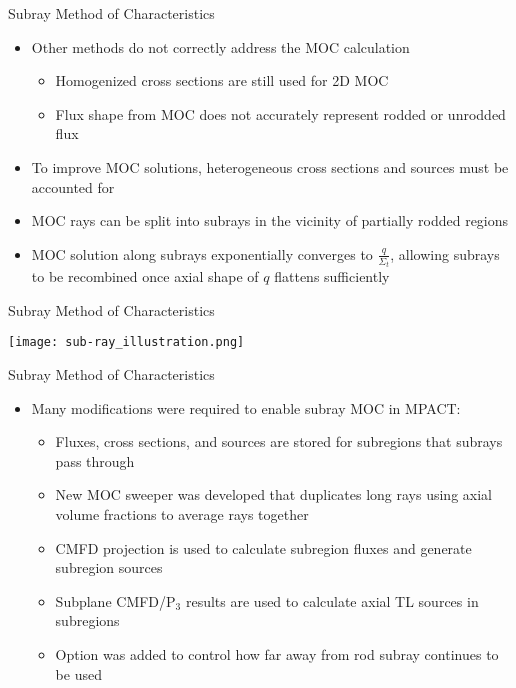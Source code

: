 \begin{frame}[t]{Subray Method of Characteristics}

\begin{itemize}
    \item Other methods do not correctly address the MOC calculation
    \begin{itemize}
        \item Homogenized cross sections are still used for 2D MOC
        \item Flux shape from MOC does not accurately represent rodded or unrodded flux
    \end{itemize}
    \item To improve MOC solutions, heterogeneous cross sections and sources must be accounted for
    \item MOC rays can be split into subrays in the vicinity of partially rodded regions
    \item MOC solution along subrays exponentially converges to $\frac{q}{\Sigma_t}$, allowing subrays to be recombined once axial shape of $q$ flattens sufficiently
\end{itemize}

\end{frame}


\begin{frame}[t]{Subray Method of Characteristics}
    
\begin{center}
\texttt{[image: sub-ray\_illustration.png]}
\end{center}

\end{frame}


\begin{frame}[t]{Subray Method of Characteristics}
    
    \begin{itemize}
        \item Many modifications were required to enable subray MOC in MPACT:
        \begin{itemize}
            \item Fluxes, cross sections, and sources are stored for subregions that subrays pass through
            \item New MOC sweeper was developed that duplicates long rays using axial volume fractions to average rays together
            \item CMFD projection is used to calculate subregion fluxes and generate subregion sources
            \item Subplane CMFD/P$_3$ results are used to calculate axial TL sources in subregions
            \item Option was added to control how far away from rod subray continues to be used
        \end{itemize}
    \end{itemize}

\end{frame}

